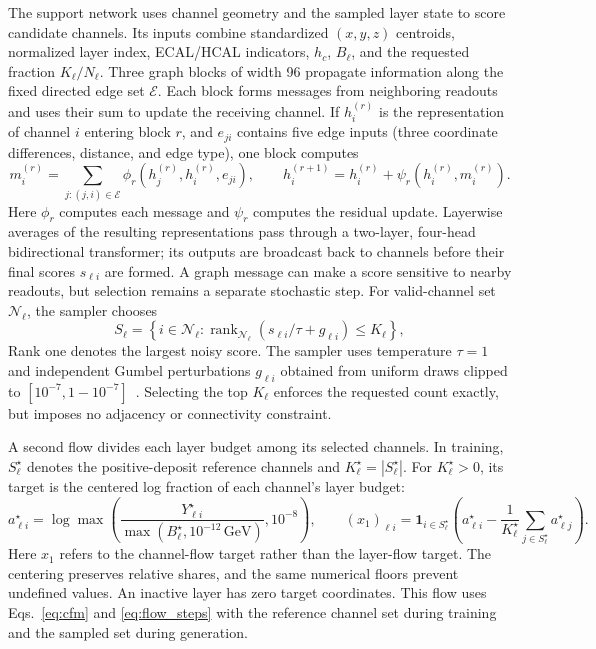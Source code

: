 \documentclass[11pt]{article}
\newcommand{\GeV}{\,\mathrm{GeV}}
\begin{document}
The support network uses channel geometry and the sampled layer state to score candidate channels. Its inputs combine standardized $(x,y,z)$ centroids, normalized layer index, ECAL/HCAL indicators, $h_c$, $B_\ell$, and the requested fraction $K_\ell/N_\ell$. Three graph blocks of width 96 propagate information along the fixed directed edge set $\mathcal E$. Each block forms messages from neighboring readouts and uses their sum to update the receiving channel. If $h_i^{(r)}$ is the representation of channel $i$ entering block $r$, and $e_{ji}$ contains five edge inputs (three coordinate differences, distance, and edge type), one block computes
\begin{equation}
 m_i^{(r)}=\sum_{j:(j,i)\in\mathcal E}
 \phi_r(h_j^{(r)},h_i^{(r)},e_{ji}),\qquad
 h_i^{(r+1)}=h_i^{(r)}+\psi_r(h_i^{(r)},m_i^{(r)}).
 \label{eq:message}
\end{equation}
Here $\phi_r$ computes each message and $\psi_r$ computes the residual update. Layerwise averages of the resulting representations pass through a two-layer, four-head bidirectional transformer; its outputs are broadcast back to channels before their final scores $s_{\ell i}$ are formed. A graph message can make a score sensitive to nearby readouts, but selection remains a separate stochastic step. For valid-channel set $\mathcal N_\ell$, the sampler chooses
\begin{equation}
 S_\ell=\left\{i\in\mathcal N_\ell:
 \operatorname{rank}_{\mathcal N_\ell}(s_{\ell i}/\tau+g_{\ell i})\leq K_\ell\right\},
 \label{eq:topk}
\end{equation}
Rank one denotes the largest noisy score. The sampler uses temperature $\tau=1$ and independent Gumbel perturbations $g_{\ell i}$ obtained from uniform draws clipped to $[10^{-7},1-10^{-7}]$~\cite{gumbeltopk}. Selecting the top $K_\ell$ enforces the requested count exactly, but imposes no adjacency or connectivity constraint.

A second flow divides each layer budget among its selected channels. In training, $S_\ell^\star$ denotes the positive-deposit reference channels and $K_\ell^\star=|S_\ell^\star|$. For $K_\ell^\star>0$, its target is the centered log fraction of each channel's layer budget:
\begin{equation}
 a_{\ell i}^\star=\log\max\!\left(
 \frac{Y_{\ell i}^\star}{\max(B_\ell^\star,10^{-12}\GeV)},10^{-8}\right),\qquad
 (x_1)_{\ell i}=\mathbf 1_{i\in S_\ell^\star}
 \left(a_{\ell i}^\star-\frac{1}{K_\ell^\star}
 \sum_{j\in S_\ell^\star}a_{\ell j}^\star\right).
 \label{eq:share_target}
\end{equation}
Here $x_1$ refers to the channel-flow target rather than the layer-flow target. The centering preserves relative shares, and the same numerical floors prevent undefined values. An inactive layer has zero target coordinates. This flow uses Eqs.~\eqref{eq:cfm} and \eqref{eq:flow_steps} with the reference channel set during training and the sampled set during generation.
\end{document}
